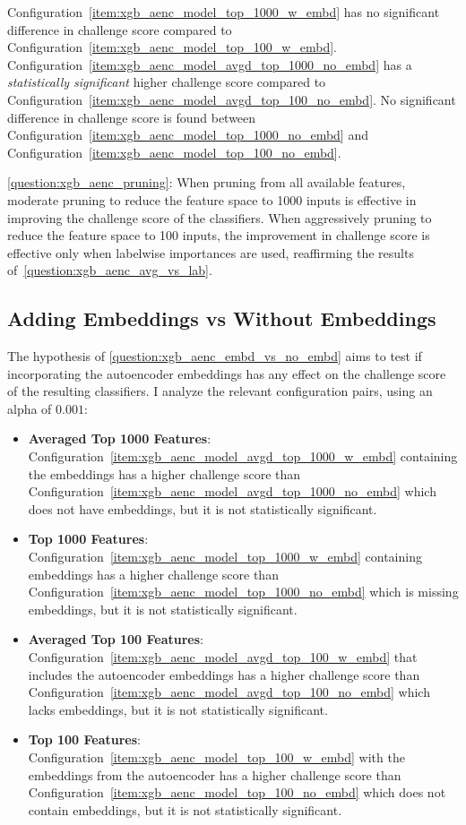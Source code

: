 \documentclass[\main/thesis.tex]{subfiles}
\begin{document}
\begin{itemize}
    Configuration~\ref{item:xgb_aenc_model_top_1000_w_embd} has no significant difference in challenge score compared to Configuration~\ref{item:xgb_aenc_model_top_100_w_embd}.
    Configuration~\ref{item:xgb_aenc_model_avgd_top_1000_no_embd} has a \emph{statistically significant} higher challenge score compared to Configuration~\ref{item:xgb_aenc_model_avgd_top_100_no_embd}.
    No significant difference in challenge score is found between Configuration~\ref{item:xgb_aenc_model_top_1000_no_embd} and Configuration~\ref{item:xgb_aenc_model_top_100_no_embd}.
\end{itemize}

\ref{question:xgb_aenc_pruning}: When pruning from all available features, moderate pruning to reduce the feature space to 1000 inputs is effective in improving the challenge score of the classifiers.
When aggressively pruning to reduce the feature space to 100 inputs, the improvement in challenge score is effective only when labelwise importances are used, reaffirming the results of~\ref{question:xgb_aenc_avg_vs_lab}.

\subsection{Adding Embeddings vs Without Embeddings}
The hypothesis of \ref{question:xgb_aenc_embd_vs_no_embd} aims to test if incorporating the autoencoder embeddings has any effect on the challenge score of the resulting classifiers.
I analyze the relevant configuration pairs, using an alpha of $0.001$:
\begin{itemize}
    \item \textbf{Averaged Top 1000 Features}: Configuration~\ref{item:xgb_aenc_model_avgd_top_1000_w_embd} containing the embeddings has a higher challenge score than Configuration~\ref{item:xgb_aenc_model_avgd_top_1000_no_embd} which does not have embeddings, but it is not statistically significant.
    \item \textbf{Top 1000 Features}: Configuration~\ref{item:xgb_aenc_model_top_1000_w_embd} containing embeddings has a higher challenge score than Configuration~\ref{item:xgb_aenc_model_top_1000_no_embd} which is missing embeddings, but it is not statistically significant.
    \item \textbf{Averaged Top 100 Features}: Configuration~\ref{item:xgb_aenc_model_avgd_top_100_w_embd} that includes the autoencoder embeddings has a higher challenge score than Configuration~\ref{item:xgb_aenc_model_avgd_top_100_no_embd} which lacks embeddings, but it is not statistically significant.
    \item \textbf{Top 100 Features}: Configuration~\ref{item:xgb_aenc_model_top_100_w_embd} with the embeddings from the autoencoder has a higher challenge score than Configuration~\ref{item:xgb_aenc_model_top_100_no_embd} which does not contain embeddings, but it is not statistically significant.
\end{itemize}
\end{document}
